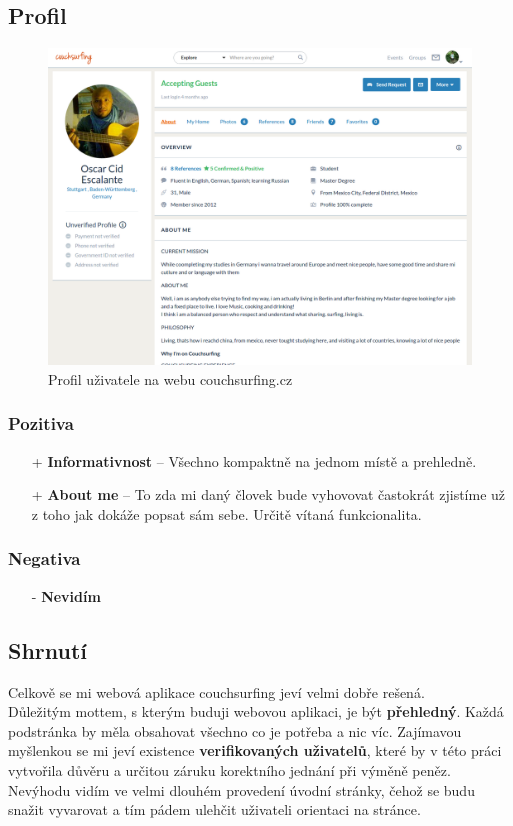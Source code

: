 \newpage
\subsection{Profil}
\begin{figure}[h]
    \centering
    \includegraphics[width=1.0\textwidth]{media/couchsurfing/profile.png}
    \caption{Profil uživatele na webu couchsurfing.cz}
    \label{fig:couchsurfing:profile}
\end{figure}
\subsubsection*{Pozitiva}
\begin{itemize}
    \item[+] \textbf{Informativnost} -- Všechno kompaktně na jednom místě a prehledně.
    \item[+] \textbf{About me} -- To zda mi daný človek bude vyhovovat častokrát zjistíme už z toho jak dokáže popsat sám sebe. Určitě vítaná funkcionalita.
\end{itemize}
\subsubsection*{Negativa}
\begin{itemize}
    \item[-] \textbf{Nevidím}
\end{itemize}



\newpage
\subsection{Shrnutí}
Celkově se mi webová aplikace couchsurfing jeví velmi dobře rešená.\\

Důležitým mottem, s kterým buduji webovou aplikaci, je být \textbf{přehledný}. Každá podstránka by měla obsahovat všechno co je potřeba a nic víc. Zajímavou myšlenkou se mi jeví existence \textbf{verifikovaných uživatelů}, které by v této práci vytvořila důvěru a určitou záruku korektního jednání při výměně peněz. Nevýhodu vidím ve velmi dlouhém provedení úvodní stránky, čehož se budu snažit vyvarovat a tím pádem ulehčit uživateli orientaci na stránce.
